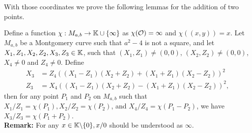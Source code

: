 With those coordinates we prove the following lemmas for the addition of two points.
\begin{lemma}
\label{lemma-add}
Define a function $\chi : M_{a,b} \to \mathbb{K} \cup \{\infty\}$ as $\chi(\mathcal{O}) = \infty$ and $\chi((x,y)) = x$. Let $M_{a,b}$ be a Montgomery curve such that $a^2-4$ is not a square, and let $X_1, Z_1, X_2, Z_2, X_3, Z_3 \in \mathbb{K}$, such that $(X_1,Z_1) \neq (0,0)$, $(X_2,Z_2) \neq (0,0)$, $X_4 \neq 0$ and $Z_4 \neq 0$.
Define
\begin{align*}
X_3 &= Z_4((X_1 - Z_1)(X_2+Z_2) + (X_1+Z_1)(X_2-Z_2))^2\\
Z_3 &= X_4((X_1 - Z_1)(X_2+Z_2) - (X_1+Z_1)(X_2-Z_2))^2,
\end{align*}
then for any point $P_1$ and $P_2$ on $M_{a,b}$ such that $X_1/Z_1 = \chi(P_1), X_2/Z_2 = \chi(P_2)$, and $X_4/Z_4 = \chi(P_1 - P_2)$, we have $X_3/Z_3 = \chi(P_1+P_2)$.\\
\textbf{Remark:} For any $x \in \mathbb{K} \backslash\{0\}, x/0$ should be understood as $\infty$.
\end{lemma}
%
%

